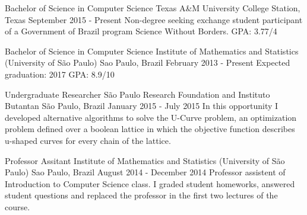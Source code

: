 \documentclass[11pt, a4paper]{awesome-cv-res}
\begin{document}
\makecvheader
\makecvfooter
  {}
  {}
  {\thepage}



\begin{cventries}
\cventry
{Bachelor of Science in Computer Science}
{Texas A\&M University}
{College Station, Texas}
{September 2015 - Present}
{Non-degree seeking exchange student participant of a Government of Brazil program Science Without Borders. \newline GPA: 3.77/4}
\newline 
\newline

\cventry
{Bachelor of Science in Computer Science} %
{Institute of Mathematics and Statistics (University of São Paulo)} %
{Sao Paulo, Brazil} %
{February 2013 - Present} %
{Expected graduation: 2017 \newline GPA: 8.9/10}
\end{cventries}

\begin{cventries}
\cventry
{Undergraduate Researcher}
{São Paulo Research Foundation and Instituto Butantan}
{São Paulo, Brazil}
{January 2015 - July 2015}
{In this opportunity I developed alternative algorithms to solve the U-Curve problem, an optimization problem defined over a boolean lattice in which the objective function describes u-shaped curves for every chain of the lattice.}
\newline 
\newline

\cventry
{Professor Assitant} 
{Institute of Mathematics and Statistics (University of São Paulo)} 
{Sao Paulo, Brazil}
{August 2014 - December 2014}
{Professor assistent of Introduction to Computer Science class. I graded student homeworks, answered student questions and replaced the professor in the first two lectures of the course.}
\end{cventries}
\end{document}

